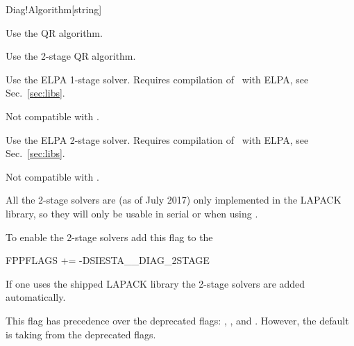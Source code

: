 \begin{fdfentry}{Diag!Algorithm}[string]
\begin{fdfoptions}
    Use the QR algorithm.


    Use the 2-stage QR algorithm.

    
    
    Use the ELPA\cite{ELPA,ELPA-1} 1-stage solver. Requires
    compilation of \siesta\ with ELPA, see Sec.~\ref{sec:libs}.

    Not compatible with .

    
    Use the ELPA\cite{ELPA,ELPA-1} 2-stage solver. Requires
    compilation of \siesta\ with ELPA, see Sec.~\ref{sec:libs}.

    Not compatible with .

  \end{fdfoptions}

  \note All the 2-stage solvers are (as of July 2017) only
  implemented in the LAPACK library, so they will only be usable in
  serial or when using .

  To enable the 2-stage solvers add this flag to the 
  \begin{shellexample}
    FPPFLAGS += -DSIESTA__DIAG_2STAGE
  \end{shellexample}

  If one uses the shipped LAPACK library the 2-stage solvers are added
  automatically.


  \note This flag has precedence over the deprecated flags:
  , ,  and
  . However, the default is taking from the
  deprecated flags.
  
\end{fdfentry}


